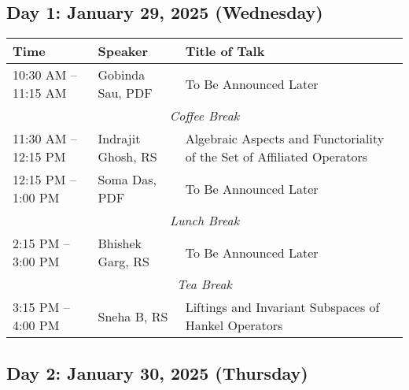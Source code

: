 %
%
\subsection*{Day 1: January 29, 2025 (Wednesday)}

\noindent
\renewcommand{\arraystretch}{1.5} %
\begin{tabular}{|p{3.5cm}|p{4cm}|p{7cm}|}
	\hline
	\textbf{Time} & \textbf{Speaker} & \textbf{Title of Talk} \\
	\hline
	10:30 AM -- 11:15 AM & Gobinda Sau, PDF & To Be Announced Later \\
	\hline
	\multicolumn{3}{|c|}{\textit{Coffee Break}} \\
	\hline
    11:30 AM -- 12:15 PM & Indrajit Ghosh, RS & Algebraic Aspects and Functoriality of the Set of Affiliated Operators \\
	\hline
	12:15 PM -- 1:00 PM & Soma Das, PDF & To Be Announced Later \\
	\hline
	\multicolumn{3}{|c|}{\textit{Lunch Break}} \\
	\hline
	2:15 PM -- 3:00 PM & Bhishek Garg, RS & To Be Announced Later \\
	\hline
	\multicolumn{3}{|c|}{\textit{Tea Break}} \\
	\hline
	3:15 PM -- 4:00 PM & Sneha B, RS & Liftings and Invariant Subspaces of Hankel Operators\\
	\hline

\end{tabular}


\subsection*{Day 2: January 30, 2025 (Thursday)}

